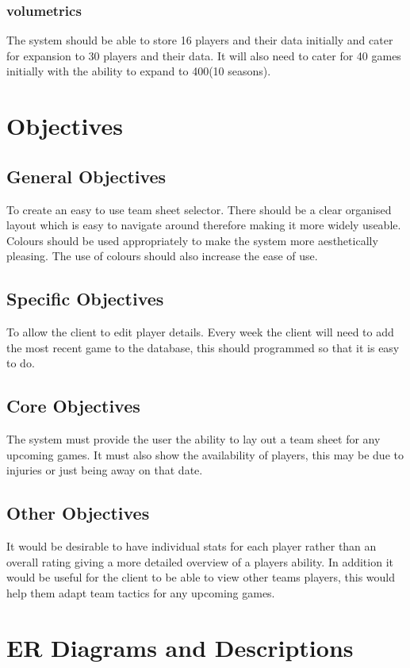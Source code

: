 \subsubsection{volumetrics}
The system should be able to store 16 players and their data initially and cater for expansion to 30 players and their data. It will also need to cater for 40 games initially with the ability to expand to 400(10 seasons). 
\section{Objectives}

\subsection{General Objectives}
To create an easy to use team sheet selector. There should be a clear organised layout which is easy to navigate around therefore making it more widely useable. Colours should be used appropriately to make the system more aesthetically pleasing. The use of colours should also increase the ease of use. 
\subsection{Specific Objectives}
To allow the client to edit player details. Every week the client will need to add the most recent game to the database, this should programmed so that it is easy to do.
\subsection{Core Objectives}
The system must provide the user the ability to lay out a team sheet for any upcoming games. It must also show the availability of players, this may be due to injuries or just being away on that date.     
\subsection{Other Objectives}
It would be desirable to have individual stats for each player rather than an overall rating giving a more detailed overview of a players ability. In addition it would be useful for the client to be able to view other teams players, this would help them adapt team tactics for any upcoming games.


\section{ER Diagrams and Descriptions}

